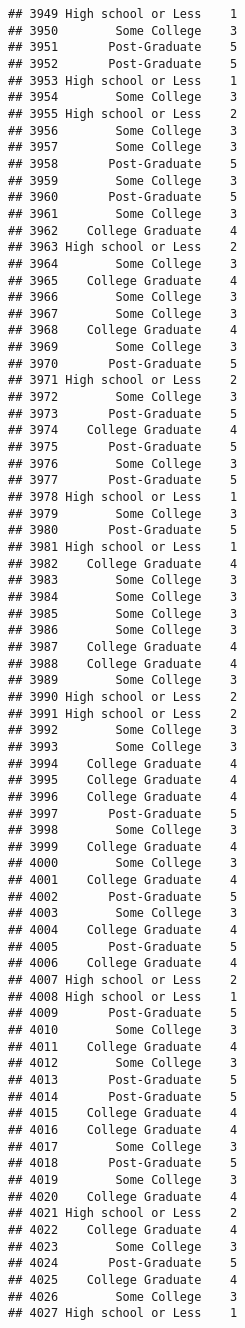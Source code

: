 \documentclass[
]{article}
\begin{document}
\begin{verbatim}
## 3949 High school or Less    1
## 3950        Some College    3
## 3951       Post-Graduate    5
## 3952       Post-Graduate    5
## 3953 High school or Less    1
## 3954        Some College    3
## 3955 High school or Less    2
## 3956        Some College    3
## 3957        Some College    3
## 3958       Post-Graduate    5
## 3959        Some College    3
## 3960       Post-Graduate    5
## 3961        Some College    3
## 3962    College Graduate    4
## 3963 High school or Less    2
## 3964        Some College    3
## 3965    College Graduate    4
## 3966        Some College    3
## 3967        Some College    3
## 3968    College Graduate    4
## 3969        Some College    3
## 3970       Post-Graduate    5
## 3971 High school or Less    2
## 3972        Some College    3
## 3973       Post-Graduate    5
## 3974    College Graduate    4
## 3975       Post-Graduate    5
## 3976        Some College    3
## 3977       Post-Graduate    5
## 3978 High school or Less    1
## 3979        Some College    3
## 3980       Post-Graduate    5
## 3981 High school or Less    1
## 3982    College Graduate    4
## 3983        Some College    3
## 3984        Some College    3
## 3985        Some College    3
## 3986        Some College    3
## 3987    College Graduate    4
## 3988    College Graduate    4
## 3989        Some College    3
## 3990 High school or Less    2
## 3991 High school or Less    2
## 3992        Some College    3
## 3993        Some College    3
## 3994    College Graduate    4
## 3995    College Graduate    4
## 3996    College Graduate    4
## 3997       Post-Graduate    5
## 3998        Some College    3
## 3999    College Graduate    4
## 4000        Some College    3
## 4001    College Graduate    4
## 4002       Post-Graduate    5
## 4003        Some College    3
## 4004    College Graduate    4
## 4005       Post-Graduate    5
## 4006    College Graduate    4
## 4007 High school or Less    2
## 4008 High school or Less    1
## 4009       Post-Graduate    5
## 4010        Some College    3
## 4011    College Graduate    4
## 4012        Some College    3
## 4013       Post-Graduate    5
## 4014       Post-Graduate    5
## 4015    College Graduate    4
## 4016    College Graduate    4
## 4017        Some College    3
## 4018       Post-Graduate    5
## 4019        Some College    3
## 4020    College Graduate    4
## 4021 High school or Less    2
## 4022    College Graduate    4
## 4023        Some College    3
## 4024       Post-Graduate    5
## 4025    College Graduate    4
## 4026        Some College    3
## 4027 High school or Less    1

\end{verbatim}
\end{document}
